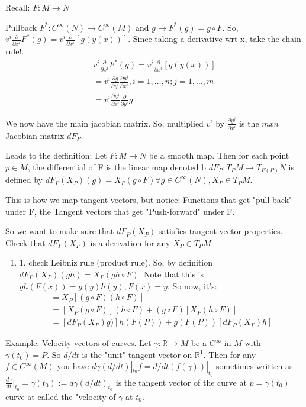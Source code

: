 \documentclass[12pt,letterpaper]{article}
\begin{document}
Recall: $F: M \rightarrow N$

Pullback $F^* : C^{\infty}(N) \rightarrow C^{\infty}(M)$ and $g \rightarrow F^*(g) = g \circ F$. So, $v^i \frac{\partial}{\partial x^i} F^*(g) = v^i \frac{\partial}{\partial x^i} [g(y(x))]$. Since taking a derivative wrt x, take the chain rule!. 
\begin{align}
    v^i \frac{\partial}{\partial x^i} F^*(g) = v^i \frac{\partial}{\partial x^i} [g(y(x))] \\
    = v^i \frac{\partial g}{\partial y^i} \frac{\partial y^j}{\partial x^i}, i=1, \dots, n; j=1, \dots, m \\
    = v^i \frac{\partial y^j}{\partial x^i} \frac{\partial}{\partial y^i} g
\end{align}

We now have the main jacobian matrix. So, multiplied $v^i$ by $\frac{\partial y^j}{\partial x^i}$ is the $m x n$ Jacobian matrix $dF_P$.

Leads to the deffinition: Let $F: M \rightarrow N$ be a smooth map. Then for each point $p \in M$, the differential of F is the linear map denoted b $dF_P: T_PM \rightarrow T_{F(P)} N$ is defined by $dF_P(X_P)(g) = X_P (g \circ F) \forall g \in C^{\infty}(N), X_P \in T_PM$. 

This is how we map tangent vectors, but notice: Functions that get "pull-back" under F, the Tangent vectors that get "Push-forward" under F. 

So we want to make sure  that $dF_P(X_P)$ satisfies tangent vector properties. Check that $dF_P(X_P)$ is a derivation for any $X_P \in T_P M$. 
\begin{enumerate}
    \item 1. check Leibniz rule (product rule). So, by definition $dF_P(X_P)(gh) = X_P(gh \circ F) $. Note that this is $gh(F(x)) = g(y)h(y), F(x) = y$. So now, it's:
    \begin{align}
        =X_P[(g \circ F) (h \circ F)] \\
        = [X_P(g \circ F)] (h \circ F) + (g \circ F) [X_P(h \circ F)] \\
        = [dF_P(X_P) g)]h(F(P)) + g(F(P))[dF_P(X_P)h ]
    \end{align}
\end{enumerate}

Example: Velocity vectors of curves. Let $\gamma : \mathbb{R} \rightarrow M$ be a $C^{\infty}$ in $M$ with $\gamma(t_0)=P$. So $d/dt$ is the "unit" tangent vector on $\mathbb{R}^1$. Then for any $ f \in C^{\infty}(M)$ you have $d\gamma (d/dt)|_{t_0}f = d/dt (f(\gamma))|_{t_0}$ sometimes written as $\frac{d\gamma}{dt}|_{t_0} = \gamma(t_0) := d\gamma(d/dt)_{t_0}$ is the tangent vector of the curve at $p = \gamma(t_0)$ curve at called the "velocity of $\gamma$ at $t_0$.
 
\end{document}
